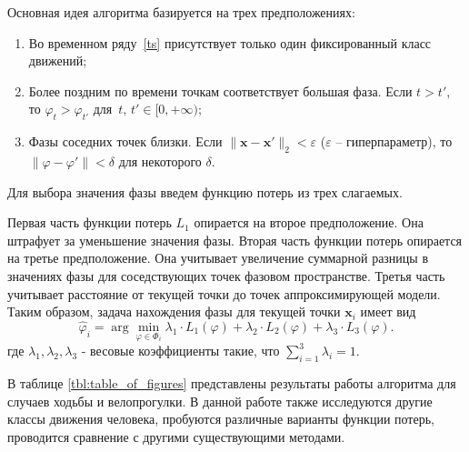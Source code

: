 \documentclass[12pt, twoside]{article}
\theoremstyle{definition}
\def\eps{\varepsilon}
\begin{document}
Основная идея алгоритма базируется на трех предположениях:
\begin{enumerate}
    \item Во временном ряду~\eqref{ts} присутствует только один фиксированный класс движений; 
    
    \item Более поздним по времени точкам соответствует большая фаза.  
    Если $t > t'$, то $\varphi_t > \varphi_{t'}$ для~$t,\, t' \in [0,+\infty)$;
    
    \item Фазы соседних точек близки. Если $\| \mathbf{x} - \mathbf{x}' \|_2 < \eps$ ($\eps$ -- гиперпараметр), то $\| \varphi - \varphi' \| < \delta$ для некоторого $\delta$.
\end{enumerate}

Для выбора значения фазы введем функцию потерь из трех слагаемых.

Первая часть функции потерь $L_1$ опирается на второе предположение. Она штрафует за уменьшение значения фазы.
Вторая часть функции потерь опирается на третье предположение.
Она учитывает увеличение суммарной разницы в значениях фазы для соседствующих точек фазовом пространстве.
Третья часть учитывает расстояние от текущей точки до точек аппроксимирующей модели.
Таким образом, задача нахождения фазы для текущей точки $\mathbf{x}_i$ имеет вид
\begin{equation} 
\widehat{\varphi}_i = \arg\min_{\varphi \in \Phi_i} \lambda_1\cdot L_1(\varphi) + \lambda_2 \cdot L_2(\varphi) + \lambda_3 \cdot L_3(\varphi).
\label{eq:argminL} 
\end{equation}
где $\lambda_1, \lambda_2, \lambda_3$ - весовые коэффициенты такие, что $\sum_{i=1}^{3} \lambda_i = 1$.

В таблице \ref{tbl:table_of_figures} представлены результаты работы алгоритма для случаев ходьбы и велопрогулки. В данной работе также исследуются другие классы движения человека, пробуются различные варианты функции потерь, проводится сравнение с другими существующими методами.
\end{document}
